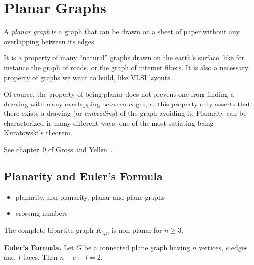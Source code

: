 
\chapter{Planar Graphs}
\label{chap:planar_graphs}

A {\it planar graph} is a graph that can be drawn on a sheet of paper without any overlapping between its edges.

It is a property of many ``natural'' graphs drawn on the earth's surface, like for instance the graph of roads, or the graph of internet fibers. It is also a necessary property of graphs we want to build, like VLSI layouts.

Of course, the property of being planar does not prevent one from finding a drawing with many overlapping between edges, as this property only asserts that there exists a drawing (or {\it embedding}) of the graph avoiding it. Planarity can be characterized in many different ways, one of the most satiating being Kuratowski's theorem.

See chapter~9 of Gross and Yellen~\cite{GrossYellen1999}.



\section{Planarity and Euler's Formula}

\begin{itemize}
\item planarity, non-planarity, planar and plane graphs

\item crossing numbers
\end{itemize}

\begin{theorem}
The complete bipartite graph $K_{3,n}$ is non-planar for $n \geq 3$.
\end{theorem}

\begin{theorem}
\textbf{Euler's Formula.}
Let $G$ be a connected plane graph having $n$ vertices, $e$ edges and
$f$ faces. Then $n - e + f = 2$.
\end{theorem}


